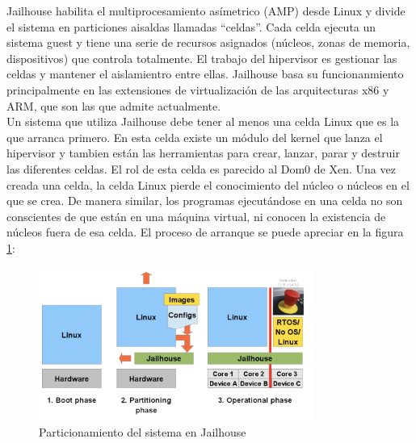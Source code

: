 Jailhouse habilita el multiprocesamiento asímetrico (AMP) desde Linux y divide el sistema en particiones aisaldas llamadas ``celdas''. Cada celda ejecuta un sistema guest y tiene una serie de recursos asignados (núcleos, zonas de memoria, dispositivos) que controla totalmente. El trabajo del hipervisor es gestionar las celdas y mantener el aislamientro entre ellas. Jailhouse basa su funcionanmiento principalmente en las extensiones de virtualización de las arquitecturas x86 y ARM, que son las que admite actualmente.\\
Un sistema que utiliza Jailhouse debe tener al menos una celda Linux que es la que arranca primero. En esta celda existe un módulo del kernel que lanza el hipervisor y tambien están las herramientas para crear, lanzar, parar y destruir las diferentes celdas. El rol de esta celda es parecido al Dom0 de Xen. Una vez creada una celda, la celda Linux pierde el conocimiento del núcleo o núcleos en el que se crea. De manera similar, los programas ejecutándose en una celda no son conscientes de que están en una máquina virtual, ni conocen la existencia de núcleos fuera de esa celda. El proceso de arranque se puede apreciar en la figura \ref{fig:jail_2}:\\

\begin{figure}[h]
  \centering
  \includegraphics[width=0.80\textwidth]{recursos/jailhouse_2.png}
  \caption{Particionamiento del sistema en Jailhouse}
  \label{fig:jail_2}
\end{figure}
